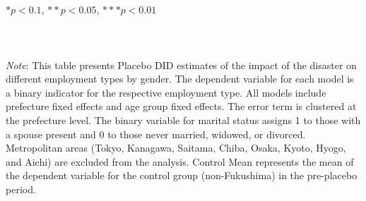 \documentclass[a4paper,12pt]{article}
\begin{document}
\begin{table}[htbp]
\vspace{-0.2cm}
\\\\{\linewidth}{\tiny $*p<0.1$, $**p<0.05$, $***p<0.01$}\\\\
\\\\{\linewidth}{\tiny \textit{Note}: This table presents Placebo DID estimates of the impact of the disaster on different employment types by gender. The dependent variable for each model is a binary indicator for the respective employment type. All models include prefecture fixed effects and age group fixed effects. The error term is clustered at the prefecture level. The binary variable for marital status assigns 1 to those with a spouse present and 0 to those never married, widowed, or divorced. Metropolitan areas (Tokyo, Kanagawa, Saitama, Chiba, Osaka, Kyoto, Hyogo, and Aichi) are excluded from the analysis. Control Mean represents the mean of the dependent variable for the control group (non-Fukushima) in the pre-placebo period.}

\label{table:Placebo_DID_Each_Employment_Type}


\end{table}



\end{document}
